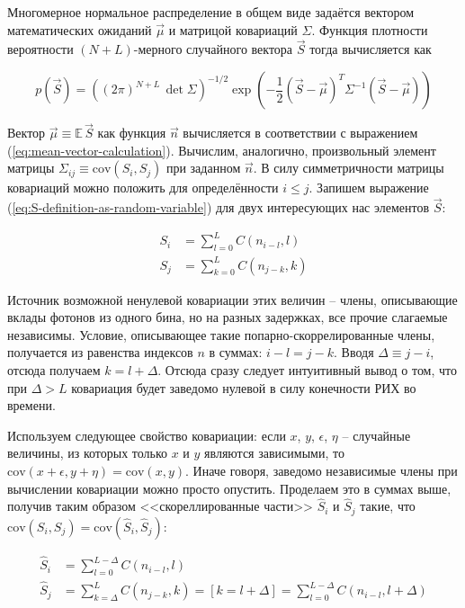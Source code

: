 \documentclass[12pt]{book}
\newcommand{\cov}{\mathrm{cov}}
\begin{document}
	Многомерное нормальное распределение в общем виде задаётся вектором математических ожиданий $\vec{\mu}$ и матрицой ковариаций $\Sigma$. Функция плотности вероятности $(N+L)$-мерного случайного вектора $\vec{S}$ тогда вычисляется как
	
	\begin{equation}
		\label{eq:multivariate-normal-density}
		p(\vec{S}) = \left( (2 \pi)^{N+L} \, \det \Sigma \right)^{-1/2} \exp \left( - \frac{1}{2} (\vec{S} - \vec{\mu})^T \Sigma^{-1} (\vec{S} - \vec{\mu}) \right)
	\end{equation}

	Вектор $\vec{\mu} \equiv \mathbb{E} \, \vec{S}$ как функция $\vec{n}$ вычисляется в соответствии с выражением (\ref{eq:mean-vector-calculation}). Вычислим, аналогично, произвольный элемент матрицы $\Sigma_{ij} \equiv \cov\left( S_i, S_j \right)$ при заданном $\vec{n}$. В силу симметричности матрицы ковариаций можно положить для определённости $i \le j$. Запишем выражение (\ref{eq:S-definition-as-random-variable}) для двух интересующих нас элементов $\vec{S}$:
	
	\begin{align}
		S_i &= \sum_{l=0}^{L} C(n_{i-l}, l)\\
		S_j &= \sum_{k=0}^{L} C(n_{j-k}, k)
	\end{align}

	Источник возможной ненулевой ковариации этих величин -- члены, описывающие вклады фотонов из одного бина, но на разных задержках, все прочие слагаемые независимы. Условие, описывающее такие попарно-скоррелированные члены, получается из равенства индексов $n$ в суммах: $i-l = j-k$. Вводя $\Delta \equiv j - i$, отсюда получаем $k = l + \Delta$. Отсюда сразу следует интуитивный вывод о том, что при $\Delta > L$ ковариация будет заведомо нулевой в силу конечности РИХ во времени.

	Используем следующее свойство ковариации: если $x$, $y$, $\epsilon$, $\eta$ -- случайные величины, из которых только $x$ и $y$ являются зависимыми, то $\cov(x + \epsilon, y + \eta) = \cov(x, y)$. Иначе говоря, заведомо независимые члены при вычислении ковариации можно просто опустить. Проделаем это в суммах выше, получив таким образом <<скореллированные части>> $\hat{S}_i$ и $\hat{S}_j$ такие, что $\cov ( S_i, S_j  ) = \cov ( \hat{S}_i, \hat{S}_j )$:
	
	\begin{align}
		\hat{S}_i &= \sum_{l=0}^{L-\Delta} C(n_{i-l}, l)\\
		\hat{S}_j &= \sum_{k=\Delta}^{L} C(n_{j-k}, k) = \left[k=l+\Delta\right] = \sum_{l=0}^{L-\Delta} C(n_{i-l}, l+\Delta)
	\end{align}
\end{document}
